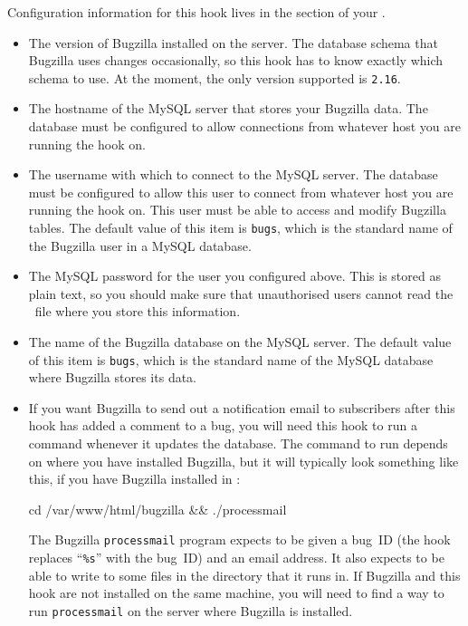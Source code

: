 Configuration information for this hook lives in the
 section of your \hgrc.
\begin{itemize}
\item[\rcitem{bugzilla}{version}] The version of Bugzilla installed on
  the server.  The database schema that Bugzilla uses changes
  occasionally, so this hook has to know exactly which schema to use.
  At the moment, the only version supported is \texttt{2.16}.
\item[\rcitem{bugzilla}{host}] The hostname of the MySQL server that
  stores your Bugzilla data.  The database must be configured to allow
  connections from whatever host you are running the 
  hook on.
\item[\rcitem{bugzilla}{user}] The username with which to connect to
  the MySQL server.  The database must be configured to allow this
  user to connect from whatever host you are running the
   hook on.  This user must be able to access and
  modify Bugzilla tables.  The default value of this item is
  \texttt{bugs}, which is the standard name of the Bugzilla user in a
  MySQL database.
\item[\rcitem{bugzilla}{password}] The MySQL password for the user you
  configured above.  This is stored as plain text, so you should make
  sure that unauthorised users cannot read the \hgrc\ file where you
  store this information.
\item[\rcitem{bugzilla}{db}] The name of the Bugzilla database on the
  MySQL server.  The default value of this item is \texttt{bugs},
  which is the standard name of the MySQL database where Bugzilla
  stores its data.
\item[\rcitem{bugzilla}{notify}] If you want Bugzilla to send out a
  notification email to subscribers after this hook has added a
  comment to a bug, you will need this hook to run a command whenever
  it updates the database.  The command to run depends on where you
  have installed Bugzilla, but it will typically look something like
  this, if you have Bugzilla installed in
  :
  \begin{codesample4}
    cd /var/www/html/bugzilla && ./processmail %
  \end{codesample4}
  The Bugzilla \texttt{processmail} program expects to be given a
  bug~ID (the hook replaces ``\texttt{\%s}'' with the bug~ID) and an
  email address.  It also expects to be able to write to some files in
  the directory that it runs in.  If Bugzilla and this hook are not
  installed on the same machine, you will need to find a way to run
  \texttt{processmail} on the server where Bugzilla is installed.
\end{itemize}

